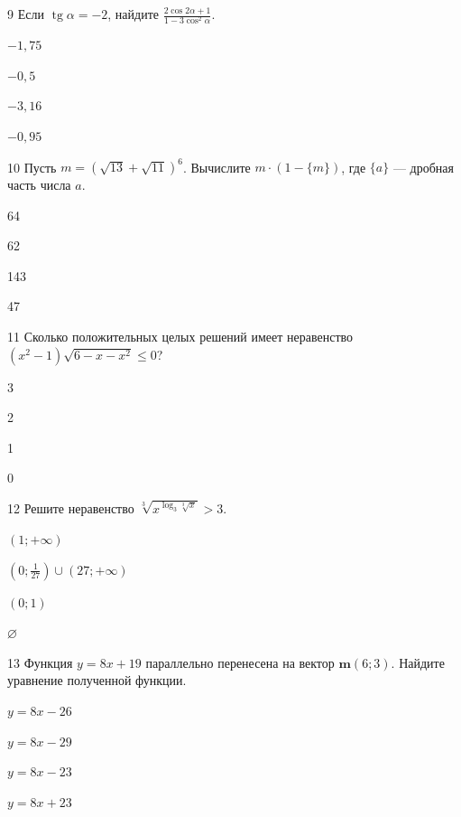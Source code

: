 \documentclass[14pt]{article}
\newcommand{\tg}{\operatorname{tg}}
\begin{document}
\begin{questionbox}{9}
    Если \(\tg \alpha = -2\), найдите \(\frac{2\cos 2\alpha + 1}{1 - 3\cos^2 \alpha}\).
    \begin{options}
        \item \(-1{,}75\)
        \item \(-0{,}5\)
        \item \(-3{,}16\)
        \item \(-0{,}95\)
    \end{options}
\end{questionbox}

\begin{questionbox}{10}
    Пусть \(m = (\sqrt{13} + \sqrt{11})^6\). Вычислите \(m \cdot (1 - \{m\})\), где \(\{a\}\) — дробная часть числа \(a\).
    \begin{options}
        \item 64
        \item 62
        \item 143
        \item 47
    \end{options}
\end{questionbox}

\begin{questionbox}{11}
    Сколько положительных целых решений имеет неравенство \((x^2 - 1)\sqrt{6 - x - x^2} \le 0\)?
    \begin{options}
        \item 3
        \item 2
        \item 1
        \item 0
    \end{options}
\end{questionbox}

\begin{questionbox}{12}
    Решите неравенство \(\sqrt[3]{x^{\log_3 \sqrt[3]{x} }} > 3\).
    \begin{options}
        \item \((1; +\infty)\)
        \item \((0; \frac{1}{27}) \cup (27; +\infty)\)
        \item \((0; 1)\)
        \item \(\varnothing\)
    \end{options}
\end{questionbox}

\begin{questionbox}{13}
    Функция \(y = 8x + 19\) параллельно перенесена на вектор \(\mathbf{m}(6; 3)\). Найдите уравнение полученной функции.
    \begin{options}
        \item \(y = 8x - 26\)
        \item \(y = 8x - 29\)
        \item \(y = 8x - 23\)
        \item \(y = 8x + 23\)
    \end{options}
\end{questionbox}
\end{document}
